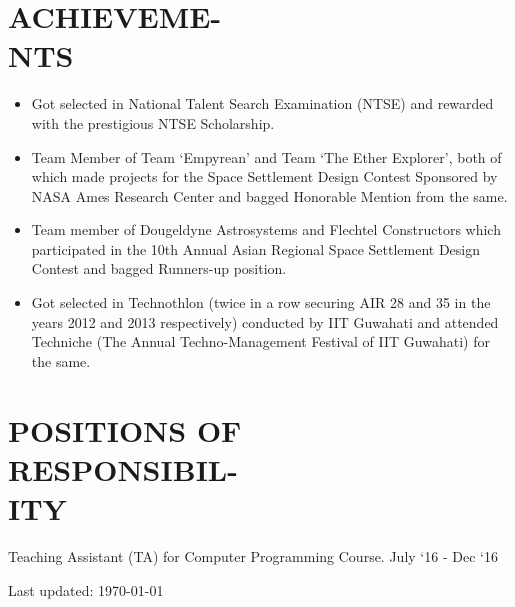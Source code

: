 \documentclass[margin]{res}
\begin{document}
\begin{resume}
  \section{ACHIEVEME-\\NTS}
  \begin{itemize}  \itemsep -2pt %
      \item Got selected in National Talent Search Examination (NTSE) and rewarded with the prestigious NTSE Scholarship.
      \item Team Member of Team ‘Empyrean’ and Team ‘The Ether Explorer’, both of which made projects for the Space Settlement Design Contest Sponsored by NASA Ames Research Center and bagged Honorable Mention from the same.
      \item Team member of Dougeldyne Astrosystems and Flechtel Constructors which participated in the 10th Annual Asian Regional Space Settlement Design\\ Contest and bagged Runners-up position.
      \item Got selected in Technothlon (twice in a row securing AIR 28 and 35 in the years 2012 and 2013 respectively) conducted by IIT Guwahati and attended Techniche (The Annual Techno-Management Festival of IIT Guwahati) for the same.
  \end{itemize}

  \section{POSITIONS OF\\ RESPONSIBIL-\\ITY}
    Teaching Assistant (TA) for Computer Programming Course. \hfill July `16 - Dec `16\\

\begin{center}
  \begin{footnotesize}
    Last updated: \today \\
  \end{footnotesize}
\end{center}

\end{resume}
\end{document}
